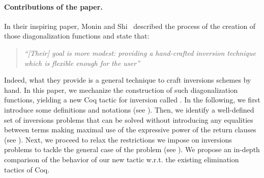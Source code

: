 \documentclass{llncs}
\begin{document}
\paragraph{Contributions of the paper.} 
In their inspiring paper, Monin and Shi~\cite{monin-shi} described the process of the creation of those diagonalization functions and state that: 
\begin{quote}
  \em ``[Their] goal is more modest: providing a hand-crafted inversion technique which is flexible enough for the user'' \end{quote} 
%
Indeed, what they provide is a general technique to craft inversions schemes by hand.  In this paper, we mechanize the construction of such diagonalization functions, yielding a new Coq tactic for inversion called .
%
In the following, we first introduce some definitions and notations (see ). 
%
Then, we identify a well-defined set of inversions problems that can be solved without introducing any equalities between terms making maximal use of the expressive power of the return clauses (see \secref{}).
%
Next, we proceed to relax the restrictions we impose on inversions problems to tackle the general case of the problem (see \secref{}). 
%
We propose an in-depth comparison of the behavior of our new  tactic w.r.t. the existing elimination tactics of Coq.   
\end{document}
